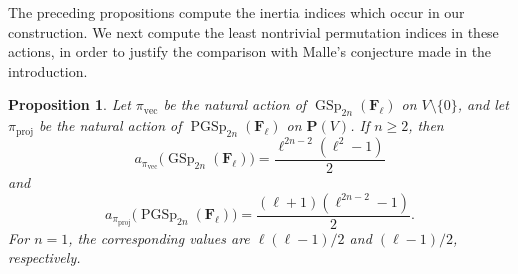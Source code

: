 \documentclass[11pt,hidelinks]{amsart}
\newtheorem{proposition}[theorem]{Proposition}
\newcommand{\F}{\mathbf F}
\newcommand{\GSp}{\operatorname{GSp}}
\newcommand{\PGSp}{\operatorname{PGSp}}
\newcommand{\PP}{\mathbf P}
\begin{document}
The preceding propositions compute the inertia indices which occur in
our construction.  We next compute the least nontrivial permutation
indices in these actions, in order to justify the comparison with
Malle's conjecture made in the introduction.

\begin{proposition}\label{prop:malle-invariants-natural}
Let $\pi_{\mathrm{vec}}$ be the natural action of
$\GSp_{2n}(\F_\ell)$ on $V\setminus\{0\}$, and let
$\pi_{\mathrm{proj}}$ be the natural action of
$\PGSp_{2n}(\F_\ell)$ on $\PP(V)$.  If $n\geq2$, then
\[
 a_{\pi_{\mathrm{vec}}}\bigl(\GSp_{2n}(\F_\ell)\bigr)
 =\frac{\ell^{2n-2}(\ell^2-1)}{2}
\]
and
\[
 a_{\pi_{\mathrm{proj}}}\bigl(\PGSp_{2n}(\F_\ell)\bigr)
 =\frac{(\ell+1)(\ell^{2n-2}-1)}{2}.
\]
For $n=1$, the corresponding values are
$\ell(\ell-1)/2$ and $(\ell-1)/2$, respectively.
\end{proposition}
\end{document}
